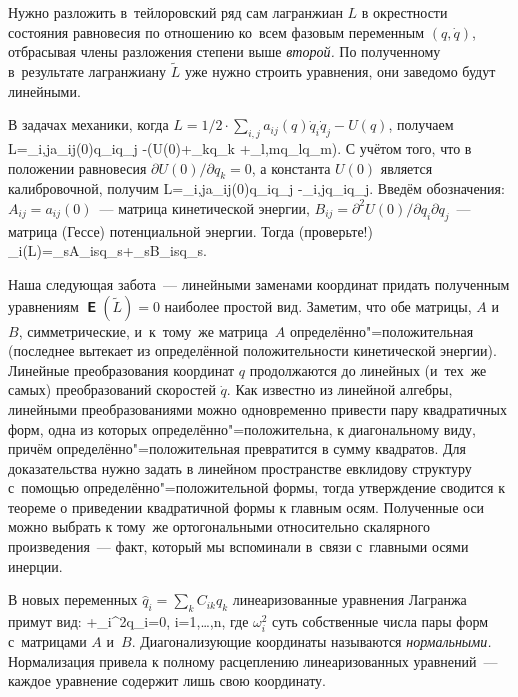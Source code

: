 \documentclass[a4paper,11pt]{article}
\def\[#1\]{\begin{align*}#1\end{align*}}
\newcommand\slashfrac[2]{{#1/#2}}
\theoremstyle{definition}
\begin{document}
Нужно разложить в~тейлоровский ряд сам лагранжиан $L$ в окрестности состояния
равновесия по отношению ко~всем фазовым переменным $(q,\dot q)$, отбрасывая
члены разложения степени выше \emph{второй.} По полученному в~результате
лагранжиану $\tilde L$ уже нужно строить уравнения, они заведомо будут
линейными.

В задачах механики, когда
$L=\slashfrac12\cdot\sum_{i,j}a_{ij}(q)\dot q_i\dot q_j-U(q)$, получаем
	\[
	\tilde L=\sum_{i,j}a_{ij}(0)\dot q_i\dot q_j
		-\left(U(0)+\sum_kq_k
		+\sum_{l,m}q_lq_m\right).
	\]
С учётом того, что в положении равновесия $\slashfrac{\partial U(0)}{\partial
q_k}=0$, а константа $U(0)$ является калибровочной, получим
	\[
	\tilde L=\sum_{i,j}a_{ij}(0)\dot q_i\dot q_j
		-\sum_{i,j}q_iq_j.
	\]
Введём обозначения: $A_{ij}=a_{ij}(0)$~— матрица кинетической энергии,
$B_{ij}=\slashfrac{\partial^2U(0)}{\partial q_i\partial q_j}$~— матрица (Гессе)
потенциальной энергии. Тогда (проверьте!)
	\[
	-\mbfsansE_i(\tilde L)=\sum_sA_{is}\ddot q_s+\sum_sB_{is}q_s.
	\]

Наша следующая забота~— линейными заменами координат придать полученным
уравнениям $\mbfsansE(\tilde L)=0$ наиболее простой вид. Заметим, что обе
матрицы, $A$ и $B$, симметрические, и~к~тому~же матрица~$A$
определённо"=положительная (последнее вытекает из определённой положительности
кинетической энергии). Линейные преобразования координат $q$ продолжаются до
линейных (и~тех~же самых) преобразований скоростей $\dot q$. Как известно из
линейной алгебры, линейными преобразованиями можно одновременно привести пару
квадратичных форм, одна из которых определённо"=положительна, к диагональному
виду, причём определённо"=положительная превратится в сумму квадратов. Для
доказательства нужно задать в линейном пространстве евклидову структуру
с~помощью определённо"=положительной формы, тогда утверждение сводится к
теореме о приведении квадратичной формы к главным осям. Полученные оси можно
выбрать к тому~же ортогональными относительно скалярного произведения~— факт,
который мы вспоминали в~связи с~главными осями инерции.

В новых переменных $\hat q_i=\sum_k C_{ik}q_k$ линеаризованные уравнения
Лагранжа примут вид:
	\[
	\ddot{\hat q_i}+\omega_i^2\hat q_i=0,
	\quad
	i=1,\ldots,n,
	\]
где $\omega_i^2$ суть собственные числа пары форм с~матрицами $A$ и~$B$.
Диагонализующие координаты называются \emph{нормальными.} Нормализация привела
к полному расцеплению линеаризованных уравнений~— каждое уравнение содержит
лишь свою координату.
\end{document}
